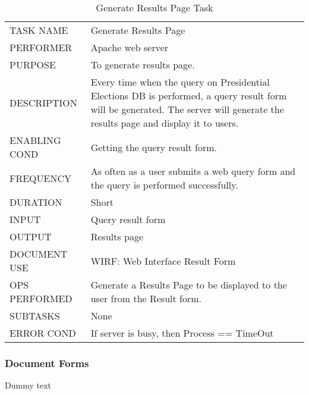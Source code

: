 \documentclass{article}
\begin{document}
\begin{table}[h!]
  \centering
  \caption{Generate Results Page Task}
  \label{tab:table8}
  \begin{tabular}{lp{10cm}}
       \hline
     TASK NAME & Generate Results Page\\
     PERFORMER & Apache web server\\
     PURPOSE & To generate results page.\\
     DESCRIPTION & Every time when the query on Presidential Elections DB is performed, a query result form will be generated. The server will generate the results page and display it to users.\\
     ENABLING COND & Getting the query result form.\\
     FREQUENCY & As often as a user submits a web query form and the query is performed successfully.\\
     DURATION & Short\\
     INPUT & Query result form\\
     OUTPUT & Results page\\
     DOCUMENT USE & WIRF: Web Interface Result Form\\
     OPS PERFORMED &  Generate a Results Page to be displayed to the user from the Result form.\\
     SUBTASKS & None\\
     ERROR COND &  If server is busy, then Process == TimeOut\\
       \hline
  \end{tabular}
\end{table}


\subsubsection{Document Forms}
Dummy text
\end{document}
